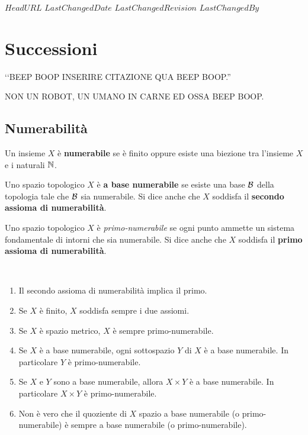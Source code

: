 \svnidlong
{$HeadURL$}
{$LastChangedDate$}
{$LastChangedRevision$}
{$LastChangedBy$}

\chapter{Successioni}

\begin{introduction}
‘‘BEEP BOOP INSERIRE CITAZIONE QUA BEEP BOOP.''
\begin{flushright}
	\textsc{NON UN ROBOT,} UN UMANO IN CARNE ED OSSA BEEP BOOP.
\end{flushright}
\end{introduction}

\section{Numerabilità}
\begin{define}
Un insieme $X$ è \textbf{numerabile} se è finito oppure esiste una biezione tra l'insieme $X$ e i naturali $\mathbb{N}$.
\end{define}
\begin{define}
Uno spazio topologico $X$ è \textbf{a base numerabile} se esiste una base $\mathcal{B}$ della topologia tale che $\mathcal{B}$ sia numerabile. %
Si dice anche che $X$ soddisfa il \textbf{secondo assioma di numerabilità}.
\end{define}
\begin{define}
Uno spazio topologico $X$ è \textit{primo-numerabile} se ogni punto ammette un sistema fondamentale di intorni che sia numerabile. Si dice anche che $X$ soddisfa il \textbf{primo assioma di numerabilità}.
\end{define}
\begin{observe}~{}
\begin{enumerate}
\item Il secondo assioma di numerabilità implica il primo.
\item Se $X$ è finito, $X$ soddisfa sempre i due assiomi.
\item Se $X$ è spazio metrico, $X$ è sempre primo-numerabile.
\item Se $X$ è a base numerabile, ogni sottospazio $Y$ di $X$ è a base numerabile. In particolare $Y$ è primo-numerabile.
\item Se $X$ e $Y$ sono a base numerabile, allora $X\times Y$ è a base numerabile. In particolare $X\times Y$ è primo-numerabile.
\item Non è vero che il quoziente di $X$ spazio a base numerabile (o primo-numerabile) è sempre a base numerabile (o primo-numerabile).
\end{enumerate}
\end{observe}
